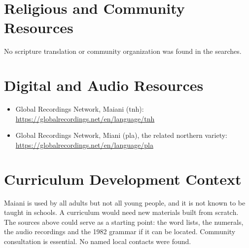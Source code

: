\documentclass[12pt]{article}
\begin{document}
\section{Religious and Community Resources}
No scripture translation or community organization was found in the searches.

\section{Digital and Audio Resources}
\begin{itemize}
\item Global Recordings Network, Maiani (tnh): \url{https://globalrecordings.net/en/language/tnh}
\item Global Recordings Network, Miani (pla), the related northern variety: \url{https://globalrecordings.net/en/language/pla}
\end{itemize}

\section{Curriculum Development Context}
Maiani is used by all adults but not all young people, and it is not known to be taught in schools. A curriculum would need new materials built from scratch. The sources above could serve as a starting point: the word lists, the numerals, the audio recordings and the 1982 grammar if it can be located. Community consultation is essential. No named local contacts were found.
\end{document}
